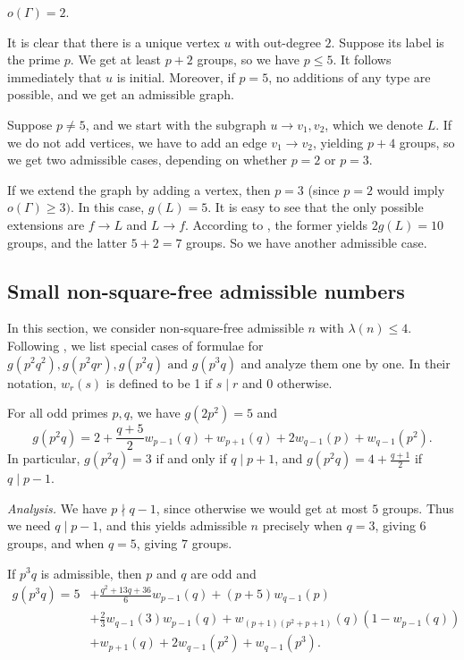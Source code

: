  $o(\Gamma) = 2$.

It is clear that there is a unique vertex $u$ with out-degree $2$. Suppose its label is the prime $p$.
We get at least $p + 2$ groups, so we have $p \le 5$. It follows immediately that $u$ is initial.
Moreover, if $p = 5$, no additions of any type are possible, and we get an admissible graph.

Suppose $p \ne 5$, and we start with the subgraph $u \to v_1, v_2$, which we denote $L$. If we do not add vertices,
we have to add an edge $v_1 \to v_2$, yielding $p + 4$ groups,
so we get two admissible cases, depending on whether $p = 2$ or $p = 3$.

If we extend the graph by adding a vertex, then $p = 3$ (since $p = 2$ would imply $o(\Gamma) \ge 3)$. In this case, $g(L) = 5$.
It is easy to see that the only possible extensions are $f \to L$ and $L \to f$. According to , the former yields $2g(L) = 10$ groups, and the latter $5 + 2 = 7$ groups. So we have another admissible case.


\subsection{Small non-square-free admissible numbers}
In this section, we consider non-square-free admissible $n$ with $\lambda(n) \le 4$.
Following {\cite{bettinafour1}}, we list special cases of formulae for $g(p^2 q^2), g(p^2 q r), g(p^2 q) \text{ and } g(p^3 q)$ and analyze them one by one.
In their notation, $w_r(s)$ is defined to be 1 if $s \mid r$ and 0 otherwise.


\begin{eufact}
	For all odd primes $p, q$, we have $g(2p^2) = 5$ and \[g(p^2 q) = 2 + \frac{q + 5}{2} w_{p - 1}(q) + w_{p + 1}(q) + 2w_{q - 1}(p) + w_{q - 1}(p^2).\]
	In particular, $g(p^2 q) = 3$ if and only if $q \mid p + 1$, and $g(p^2 q) = 4 + \frac{q + 1}{2}$ if $q \mid p - 1$.
\end{eufact}

\textit{Analysis.} We have $p \nmid q - 1$, since otherwise we would get at most $5$ groups.
Thus we need $q \mid p - 1$, and this yields admissible $n$ precisely when $q = 3$, giving $6$ groups, and when $q = 5$, giving $7$ groups.

\begin{eufact}
	If $p^3 q$ is admissible, then $p$ and $q$ are odd and
	$$\begin{aligned}
		g(p^3 q) = 5 &+ \frac{q^2 + 13q + 36}{6} w_{p - 1}(q) + (p + 5) w_{q - 1}(p) \\
		&+ \frac{2}{3} w_{q - 1}(3)w_{p - 1}(q) + w_{(p + 1)(p^2 + p + 1)}(q) (1 - w_{p - 1}(q)) \\
		&+ w_{p + 1}(q) + 2 w_{q - 1}(p^2) + w_{q - 1}(p^3).
	\end{aligned}$$
\end{eufact}


